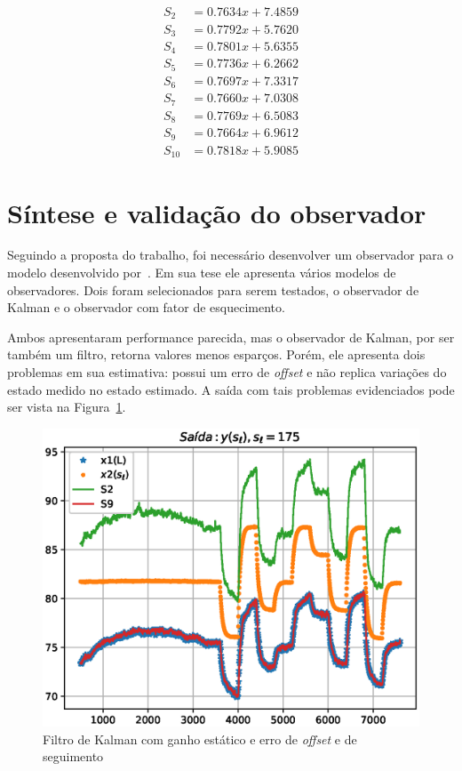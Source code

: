 \begin{align}
	\label{eq:calib-first}
	S_2    & = 0.7634x + 7.4859 \\
	S_3    & = 0.7792x + 5.7620 \\
	S_4    & = 0.7801x + 5.6355 \\
	S_5    & = 0.7736x + 6.2662 \\
	S_6    & = 0.7697x + 7.3317 \\
	S_7    & = 0.7660x + 7.0308 \\
	S_8    & = 0.7769x + 6.5083 \\
	S_9    & = 0.7664x + 6.9612 \\
	\label{eq:calib-last}
	S_{10} & = 0.7818x + 5.9085
\end{align}

\section{Síntese e validação do observador}%
\label{sec:validation}

Seguindo a proposta do trabalho, foi necessário desenvolver um observador para o
modelo desenvolvido por~\textcite{masterthesis:nelson}. Em sua tese ele
apresenta vários modelos de observadores. Dois foram selecionados para serem
testados, o observador de Kalman e o observador com fator de esquecimento.

Ambos apresentaram performance parecida, mas o observador de Kalman, por ser
também um filtro, retorna valores menos esparços. Porém, ele apresenta dois
problemas em sua estimativa: possui um erro de \textit{offset} e não replica
variações do estado medido no estado estimado. A saída com tais problemas
evidenciados pode ser vista na Figura~\ref{fig:kalman-estatico}.

\begin{figure}[ht!]
	\centering
	\captionsetup{justification=centering}
	\includegraphics[height=0.5\linewidth]{imgs/kalman-estatico}
	\caption{Filtro de Kalman com ganho estático e erro de \textit{offset} e de seguimento}%
	\label{fig:kalman-estatico}
\end{figure}

